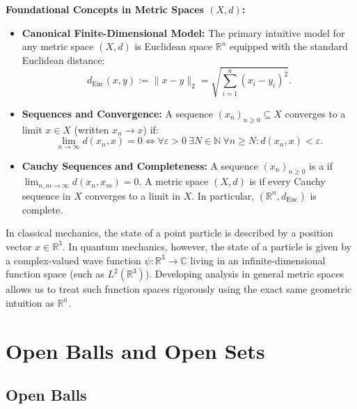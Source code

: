 \begin{content}
\textbf{Foundational Concepts in Metric Spaces $(X, d)$:}
\begin{itemize}
    \item \textbf{Canonical Finite-Dimensional Model:} The primary intuitive model for any metric space $(X, d)$ is Euclidean space $\mathbb{R}^n$ equipped with the standard Euclidean distance:
    \[
    d_{\text{Euc}}(x, y) := \|x - y\|_2 = \sqrt{\sum_{i=1}^n (x_i - y_i)^2}.
    \]
    \item \textbf{Sequences and Convergence:} A sequence $(x_n)_{n \ge 0} \subseteq X$ converges to a limit $x \in X$ (written $x_n \to x$) if:
    \[
    \lim_{n \to \infty} d(x_n, x) = 0 \iff \forall \varepsilon > 0 \ \exists N \in \mathbb{N} \ \forall n \ge N \colon d(x_n, x) < \varepsilon.
    \]
    \item \textbf{Cauchy Sequences and Completeness:} A sequence $(x_n)_{n \ge 0}$ is a  if $\lim_{n, m \to \infty} d(x_n, x_m) = 0$. A metric space $(X, d)$ is  if every Cauchy sequence in $X$ converges to a limit in $X$. In particular, $(\mathbb{R}^n, d_{\text{Euc}})$ is complete.
\end{itemize}

\begin{steps}
In classical mechanics, the state of a point particle is described by a position vector $x \in \mathbb{R}^3$. In quantum mechanics, however, the state of a particle is given by a complex-valued wave function $\psi \colon \mathbb{R}^3 \to \mathbb{C}$ living in an infinite-dimensional function space (such as $L^2(\mathbb{R}^3)$). Developing analysis in general metric spaces allows us to treat such function spaces rigorously using the exact same geometric intuition as $\mathbb{R}^n$.
\end{steps}
\end{content}

\section{Open Balls and Open Sets}

\subsection{Open Balls}

